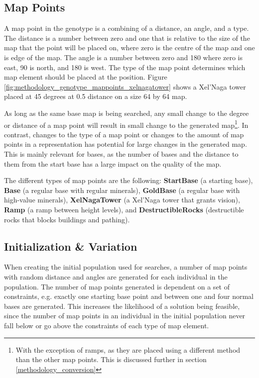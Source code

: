
\subsection{Map Points}
\label{methodology_genotype_mappoints}
A map point in the genotype is a combining of a distance, an angle, and a type. The distance is a number between zero and one that is relative to the size of the map that the point will be placed on, where zero is the centre of the map and one is edge of the map. The angle is a number between zero and 180 where zero is east, 90 is north, and 180 is west. The type of the map point determines which map element should be placed at the position. Figure \ref{fig:methodology_genotype_mappoints_xelnagatower} shows a Xel'Naga tower placed at 45 degrees at 0.5 distance on a size 64 by 64 map.


As long as the same base map is being searched, any small change to the degree or distance of a map point will result in small change to the generated map\footnote{With the exception of ramps, as they are placed using a different method than the other map points. This is discussed further in section \ref{methodology_conversion}}. In contrast, changes to the type of a map point or changes to the amount of map points in a representation has potential for large changes in the generated map. This is mainly relevant for bases, as the number of bases and the distance to them from the start base has a large impact on the quality of the map.

The different types of map points are the following: \textbf{StartBase} (a starting base), \textbf{Base} (a regular base with regular minerals), \textbf{GoldBase} (a regular base with high-value minerals), \textbf{XelNagaTower} (a Xel'Naga tower that grants vision), \textbf{Ramp} (a ramp between height levels), and \textbf{DestructibleRocks} (destructible rocks that blocks buildings and pathing).

\subsection{Initialization \& Variation}
\label{methodology_genotype_initialization}
When creating the initial population used for searches, a number of map points with random distance and angles are generated for each individual in the population. The number of map points generated is dependent on a set of constraints, e.g. exactly one starting base point and between one and four normal bases are generated. This increases the likelihood of a solution being feasible, since the number of map points in an individual in the initial population never fall below or go above the constraints of each type of map element.

